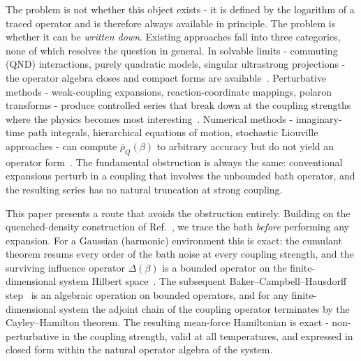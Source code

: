 The problem is not whether this object exists - it is defined by the
logarithm of a traced operator and is therefore always available in principle.
The problem is whether it can be \emph{written down}. Existing approaches fall
into three categories, none of which resolves the question in general. In
solvable limits - commuting (QND) interactions, purely quadratic models,
singular ultrastrong projections - the operator algebra closes and compact
forms are
available~\cite{campisiTalknerHanggi2009Solvable,caldeiraQuantumTunnellingDissipative1983a,grabertQuantumBrownianMotion1988,hiltHamiltonianMeanForce2011,cresserWeakUltrastrongCoupling2021a,hovhannisyanHamiltonianMeanForce2020,duGeneralizedHamiltonianMeanforce2025a,burkeStructureHamiltonianMean2024,correaPotentialRenormalisationLamb2025}.
Perturbative methods - weak-coupling expansions, reaction-coordinate
mappings, polaron transforms - produce controlled series that break down at
the coupling strengths where the physics becomes most
interesting~\cite{breuerTheoryOpenQuantum2002,nazirReactionCoordinateMapping2018,IlesSmithDijkstraLambertNazir2016,AntoSztrikacsNazirSegal2023,ShubrookIlesSmithNazir2025,hanggiFiniteQuantumDissipation2008,ingoldSpecificHeatAnomalies2009}.
Numerical methods - imaginary-time path integrals, hierarchical equations of
motion, stochastic Liouville approaches - can compute
$\bar\rho_Q(\beta)$ to arbitrary accuracy but do not yield an operator
form~\cite{moixEquilibriumreducedDensityMatrix2012,chenRigorousStochasticMatrix2014,makriExploitingClassicalDecoherence2014,tanimuraReducedHierarchicalEquations2014,songCalculationCorrelatedInitial2015,XuVadimovStockburgerAnkerhold2026,stockburgerSimulatingSpinbosonDynamics2004,mccaulPartitionfreeApproachOpen2017c}.
The fundamental obstruction is always the same: conventional expansions perturb
in a coupling that involves the unbounded bath operator, and the resulting
series has no natural truncation at strong coupling.

This paper presents a route that avoids the obstruction entirely. Building on
the quenched-density construction of
Ref.~\cite{mccaulMeanForceHamiltoniansInfluence2026}, we trace the bath
\emph{before} performing any expansion. For a Gaussian (harmonic) environment
this is exact: the cumulant theorem resums every order of the bath noise at
every coupling strength, and the surviving influence operator
$\Delta(\beta)$ is a bounded operator on the finite-dimensional system Hilbert
space~\cite{feynmanTheoryGeneralQuantum1963a,caldeiraQuantumTunnellingDissipative1983a,hubbardCalculationPartitionFunctions1959a,stratonovich1957QDistro,stockburgerExactNumberRepresentation2002}.
The subsequent Baker--Campbell--Hausdorff
step~\cite{magnusExponentialSolutionDifferential1954a,blanesMagnusExpansionIts2009,weiLieAlgebraicSolution1963}
is an algebraic operation on bounded operators, and for any finite-dimensional
system the adjoint chain of the coupling operator terminates by the
Cayley--Hamilton theorem. The resulting mean-force Hamiltonian is exact -
non-perturbative in the coupling strength, valid at all temperatures, and
expressed in closed form within the natural operator algebra of the system.

